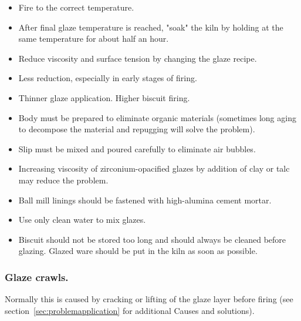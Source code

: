 \begin{itemize}
\item Fire to the correct temperature.
\item After final glaze temperature is reached, "soak" the kiln by holding at 
the 
same temperature for about half an hour.
\item Reduce viscosity and surface tension by changing the glaze recipe.
\item Less reduction, especially in early stages of firing.
\item Thinner glaze application. Higher biscuit firing.
\item Body must be prepared to eliminate organic materials (sometimes long 
aging to 
decompose the material and repugging will solve the problem).
\item Slip must be mixed and poured carefully to eliminate air bubbles.
\item Increasing viscosity of zirconium-opacified glazes by addition of clay or 
talc may reduce the problem.
\item Ball mill linings should be fastened with high-alumina cement mortar.
\item Use only clean water to mix glazes.
\item Biscuit should not be stored too long and should always be cleaned before 
glazing. Glazed ware should be put in the kiln as soon as possible.
\end{itemize}
\subsubsection{Glaze crawls.}
Normally this is caused by cracking or lifting of the glaze layer before firing 
(see section~\ref{sec:problemapplication} for additional Causes and solutions).

